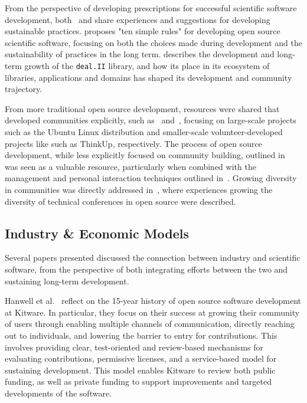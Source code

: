 \documentclass[11pt, oneside]{amsart}
\newcommand{\toolname}[1] {\textsf{#1}}
\begin{document}
From the perspective of developing prescriptions for successful scientific
software development, both~\cite{citeulike:11831265} and
\cite{1749-4699-6-1-015010} share experiences and suggestions for developing
sustainable practices.  \cite{citeulike:11831265} proposes "ten simple rules"
for developing open source scientific software, focusing on both the choices
made during development and the sustainability of practices in the long term.
\cite{1749-4699-6-1-015010} describes the development and long-term growth of
the \texttt{deal.II} library, and how its place in its ecosystem of libraries,
applications and domains has shaped its development and community trajectory.

From more traditional open source development, resources were shared that
developed communities explicitly, such as~\cite{citeulike:7888211}
and~\cite{Trapani:2011}, focusing on large-scale projects such as the Ubuntu
Linux distribution and smaller-scale volunteer-developed projects like such as
ThinkUp, respectively. The process of open source development, while less
explicitly focused on community building, outlined in~\cite{citeulike:478633}
was seen as a valuable resource, particularly when combined with the management
and personal interaction techniques outlined in~\cite{opac-b1134063}.  Growing
diversity in communities was directly addressed in~\cite{Allsopp:2012}, where
experiences growing the diversity of technical conferences in open source were
described.

\subsection{Industry \& Economic Models}

Several papers presented discussed the connection between industry and
scientific software, from the perspective of both integrating efforts between
the two and sustaining long-term development.

Hanwell et al.~\cite{Hanwell_WSSSPE} reflect on the 15-year history of open
source software development at \toolname{Kitware}.  In particular, they focus on their
success at growing their community of users through enabling multiple channels
of communication, directly reaching out to individuals, and lowering the
barrier to entry for contributions. This involves providing clear,
test-oriented and review-based mechanisms for evaluating contributions,
permissive licenses, and a service-based model for sustaining development.
This model enables \toolname{Kitware} to review both public funding, as well as private
funding to support improvements and targeted developments of the software.
\end{document}
